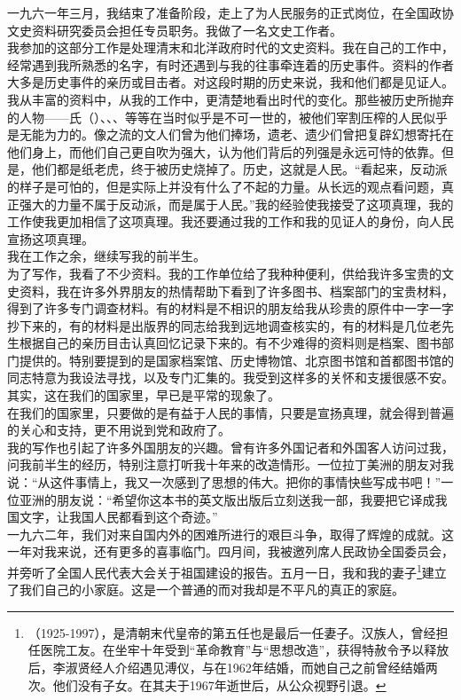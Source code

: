 一九六一年三月，我结束了准备阶段，走上了为人民服务的正式岗位，在全国政协文史资料研究委员会担任专员职务。我做了一名文史工作者。\\

我参加的这部分工作是处理清末和北洋政府时代的文史资料。我在自己的工作中，经常遇到我所熟悉的名字，有时还遇到与我的往事牵连着的历史事件。资料的作者大多是历史事件的亲历或目击者。对这段时期的历史来说，我和他们都是见证人。我从丰富的资料中，从我的工作中，更清楚地看出时代的变化。那些被历史所抛弃的人物——氏（）、、、等等在当时似乎是不可一世的，被他们宰割压榨的人民似乎是无能为力的。像之流的文人们曾为他们捧场，遗老、遗少们曾把复辟幻想寄托在他们身上，而他们自己更自吹为强大，认为他们背后的列强是永远可恃的依靠。但是，他们都是纸老虎，终于被历史烧掉了。历史，这就是人民。“看起来，反动派的样子是可怕的，但是实际上并没有什么了不起的力量。从长远的观点看问题，真正强大的力量不属于反动派，而是属于人民。”我的经验使我接受了这项真理，我的工作使我更加相信了这项真理。我还要通过我的工作和我的见证人的身份，向人民宣扬这项真理。\\

我在工作之余，继续写我的前半生。\\

为了写作，我看了不少资料。我的工作单位给了我种种便利，供给我许多宝贵的文史资料，我在许多外界朋友的热情帮助下看到了许多图书、档案部门的宝贵材料，得到了许多专门调查材料。有的材料是不相识的朋友给我从珍贵的原件中一字一字抄下来的，有的材料是出版界的同志给我到远地调查核实的，有的材料是几位老先生根据自己的亲历目击认真回忆记录下来的。有不少难得的资料则是档案、图书部门提供的。特别要提到的是国家档案馆、历史博物馆、北京图书馆和首都图书馆的同志特意为我设法寻找，以及专门汇集的。我受到这样多的关怀和支援很感不安。其实，这在我们的国家里，早已是平常的现象了。\\

在我们的国家里，只要做的是有益于人民的事情，只要是宣扬真理，就会得到普遍的关心和支持，更不用说到党和政府了。\\

我的写作也引起了许多外国朋友的兴趣。曾有许多外国记者和外国客人访问过我，问我前半生的经历，特别注意打听我十年来的改造情形。一位拉丁美洲的朋友对我说：“从这件事情上，我又一次感到了思想的伟大。把你的事情快些写成书吧！”一位亚洲的朋友说：“希望你这本书的英文版出版后立刻送我一部，我要把它译成我国文字，让我国人民都看到这个奇迹。”\\

一九六二年，我们对来自国内外的困难所进行的艰巨斗争，取得了辉煌的成就。这一年对我来说，还有更多的喜事临门。四月间，我被邀列席人民政协全国委员会，并旁听了全国人民代表大会关于祖国建设的报告。五月一日，我和我的妻子\footnote{（1925-1997），是清朝末代皇帝的第五任也是最后一任妻子。汉族人，曾经担任医院工友。在坐牢十年受到“革命教育”与“思想改造”，获得特赦令予以释放后，李淑贤经人介绍遇见溥仪，与在1962年结婚，而她自己之前曾经结婚两次。他们没有子女。在其夫于1967年逝世后，从公众视野引退。}建立了我们自己的小家庭。这是一个普通的而对我却是不平凡的真正的家庭。\\

